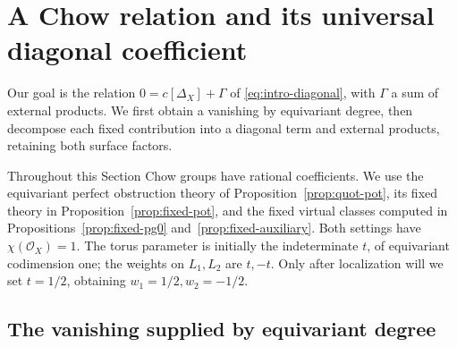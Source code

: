 \section{A Chow relation and its universal diagonal coefficient}
\label{sec:relation}

Our goal is the relation \(0=c[\Delta_X]+\Gamma\) of
\eqref{eq:intro-diagonal}, with \(\Gamma\) a sum of external products.
We first obtain a vanishing by equivariant degree, then decompose each
fixed contribution into a diagonal term and external products, retaining
both surface factors.

Throughout this Section Chow groups have rational coefficients.  We use
the equivariant perfect obstruction theory of Proposition~\ref{prop:quot-pot},
its fixed theory in Proposition~\ref{prop:fixed-pot}, and the fixed virtual
classes computed in Propositions~\ref{prop:fixed-pg0}
and~\ref{prop:fixed-auxiliary}.  Both settings have
$\chi(\mathcal O_X)=1$.  The torus parameter is initially the indeterminate
$t$, of equivariant codimension one; the weights on $L_1,L_2$ are $t,-t$.
Only after localization will we set $t=1/2$, obtaining
$w_1=1/2,w_2=-1/2$.

\subsection{The vanishing supplied by equivariant degree}

